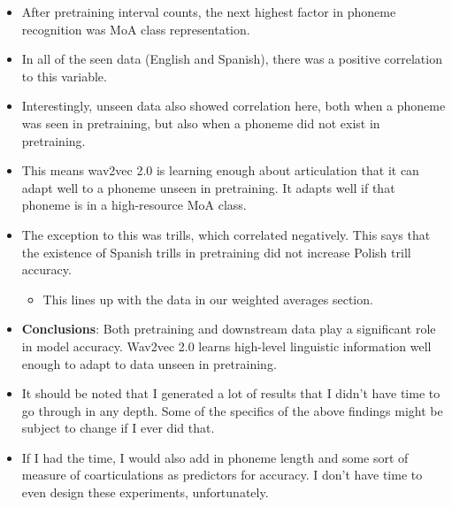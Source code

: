 \begin{itemize}
    \item After pretraining interval counts, the next highest factor in phoneme recognition was MoA class representation.
    \item In all of the seen data (English and Spanish), there was a positive correlation to this variable.
    \item Interestingly, unseen data also showed correlation here, both when a phoneme was seen in pretraining, but also when a phoneme did not exist in pretraining.
    \item This means wav2vec 2.0 is learning enough about articulation that it can adapt well to a phoneme unseen in pretraining. It adapts well if that phoneme is in a high-resource MoA class.
    \item The exception to this was trills, which correlated negatively. This says that the existence of Spanish trills in pretraining did not increase Polish trill accuracy.
    \begin{itemize}
        \item This lines up with the data in our weighted averages section. 
    \end{itemize}
    \item \textbf{Conclusions}: Both pretraining and downstream data play a significant role in model accuracy. Wav2vec 2.0 learns high-level linguistic information well enough to adapt to data unseen in pretraining.
    \item It should be noted that I generated a lot of results that I didn't have time to go through in any depth. Some of the specifics of the above findings might be subject to change if I ever did that.
    \item If I had the time, I would also add in phoneme length and some sort of measure of coarticulations as predictors for accuracy. I don't have time to even design these experiments, unfortunately.

\end{itemize}
